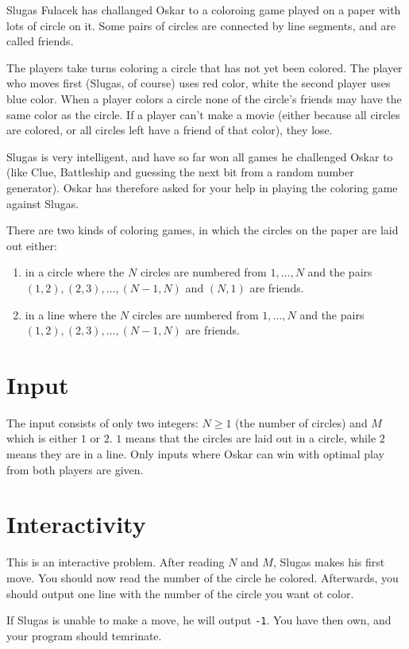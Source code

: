 Slugas Fulacek has challanged Oskar to a coloroing game played on a paper with lots of circle on it.
Some pairs of circles are connected by line segments, and are called friends.

The players take turns coloring a circle that has not yet been colored.
The player who moves first (Slugas, of course) uses red color, white the second player uses blue color.
When a player colors a circle none of the circle's friends may have the same color as the circle.
If a player can't make a movie (either because all circles are colored, or all circles left have a friend of that color), they lose.

Slugas is very intelligent, and have so far won all games he challenged Oskar to (like Clue, Battleship and guessing the next bit from a random number generator).
Oskar has therefore asked for your help in playing the coloring game against Slugas.

There are two kinds of coloring games, in which the circles on the paper are laid out either:
\begin{enumerate}
    \item in a circle where the $N$ circles are numbered from $1, \dots, N$ and the pairs $(1, 2), (2, 3), \dots, (N-1, N)$ and $(N, 1)$ are friends.
    \item in a line where the $N$ circles are numbered from $1, \dots, N$ and the pairs $(1, 2), (2, 3), \dots, (N-1, N)$ are friends.
\end{enumerate}

\section*{Input}
The input consists of only two integers: $N \ge 1$ (the number of circles) and $M$ which is either $1$ or $2$.
$1$ means that the circles are laid out in a circle, while $2$ means they are in a line.
Only inputs where Oskar can win with optimal play from both players are given.

\section*{Interactivity}
This is an interactive problem.
After reading $N$ and $M$, Slugas makes his first move.
You should now read the number of the circle he colored.
Afterwards, you should output one line with the number of the circle you want ot color.

If Slugas is unable to make a move, he will output \texttt{-1}.
You have then own, and your program should temrinate.

